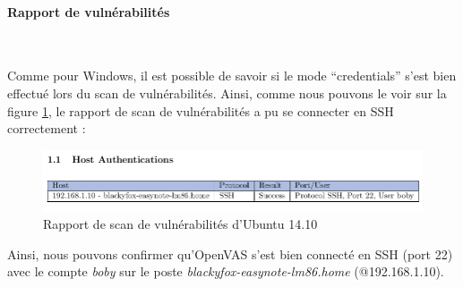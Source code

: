 \paragraph{Rapport de vulnérabilités}~\\\par
Comme pour Windows, il est possible de savoir si le mode \enquote{credentials} s'est bien effectué lors du scan de vulnérabilités. Ainsi, comme nous pouvons le voir sur la figure \ref{fig:7}, le rapport de scan de vulnérabilités a pu se connecter en SSH correctement :
\begin{figure}[H]
    \centering
    \includegraphics[width=\textwidth]{img/rep2.png}
    \caption{Rapport de scan de vulnérabilités d'Ubuntu 14.10}
    \label{fig:7}
\end{figure}
Ainsi, nous pouvons confirmer qu'OpenVAS s'est bien connecté en SSH (port 22) avec le compte \textit{boby} sur le poste \textit{blackyfox-easynote-lm86.home} (@192.168.1.10).